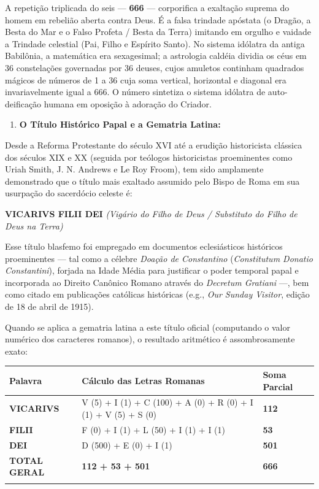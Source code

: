\documentclass[11pt,a4paper,openany]{book}
\begin{document}
A repetição triplicada do seis — \textbf{666} — corporifica a exaltação suprema do homem em rebelião aberta contra Deus. É a falsa trindade apóstata (o Dragão, a Besta do Mar e o Falso Profeta / Besta da Terra) imitando em orgulho e vaidade a Trindade celestial (Pai, Filho e Espírito Santo). No sistema idólatra da antiga Babilônia, a matemática era sexagesimal; a astrologia caldéia dividia os céus em 36 constelações governadas por 36 deuses, cujos amuletos continham quadrados mágicos de números de 1 a 36 cuja soma vertical, horizontal e diagonal era invariavelmente igual a 666. O número sintetiza o sistema idólatra de auto-deificação humana em oposição à adoração do Criador.

\begin{enumerate}
  \item \textbf{O Título Histórico Papal e a Gematria Latina:}
\end{enumerate}

Desde a Reforma Protestante do século XVI até a erudição historicista clássica dos séculos XIX e XX (seguida por teólogos historicistas proeminentes como Uriah Smith, J. N. Andrews e Le Roy Froom), tem sido amplamente demonstrado que o título mais exaltado assumido pelo Bispo de Roma em sua usurpação do sacerdócio celeste é:

\textbf{VICARIVS FILII DEI}
\textit{(Vigário do Filho de Deus / Substituto do Filho de Deus na Terra)}

Esse título blasfemo foi empregado em documentos eclesiásticos históricos proeminentes — tal como a célebre \textit{Doação de Constantino} (\textit{Constitutum Donatio Constantini}), forjada na Idade Média para justificar o poder temporal papal e incorporada ao Direito Canônico Romano através do \textit{Decretum Gratiani} —, bem como citado em publicações católicas históricas (e.g., \textit{Our Sunday Visitor}, edição de 18 de abril de 1915).

Quando se aplica a gematria latina a este título oficial (computando o valor numérico dos caracteres romanos), o resultado aritmético é assombrosamente exato:


\begin{table}[htbp]
\centering
\footnotesize
\setlength{\tabcolsep}{5pt}
\renewcommand{\arraystretch}{1.25}
\begin{tabularx}{\textwidth}{>{\raggedright\arraybackslash}p{} >{\raggedright\arraybackslash}X >{\raggedright\arraybackslash}X}
\toprule
\textbf{Palavra} & \textbf{Cálculo das Letras Romanas} & \textbf{Soma Parcial} \\
\midrule
\textbf{VICARIVS} & V (5) + I (1) + C (100) + A (0) + R (0) + I (1) + V (5) + S (0) & \textbf{112} \\
\addlinespace[3pt]
\textbf{FILII} & F (0) + I (1) + L (50) + I (1) + I (1) & \textbf{53} \\
\addlinespace[3pt]
\textbf{DEI} & D (500) + E (0) + I (1) & \textbf{501} \\
\addlinespace[3pt]
\textbf{TOTAL GERAL} & \textbf{112 + 53 + 501} & \textbf{666} \\
\addlinespace[3pt]
\bottomrule
\end{tabularx}
\end{table}
\end{document}
